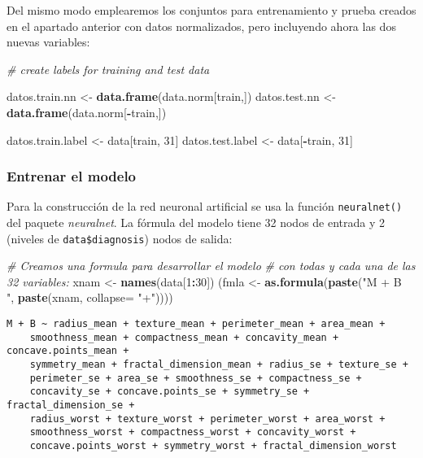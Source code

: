\documentclass[
]{article}
\newenvironment{Shaded}{\begin{snugshade}}{\end{snugshade}}
\newcommand{\CommentTok}[1]{\textcolor[rgb]{0.56,0.35,0.01}{\textit{#1}}}
\newcommand{\DataTypeTok}[1]{\textcolor[rgb]{0.13,0.29,0.53}{#1}}
\newcommand{\DecValTok}[1]{\textcolor[rgb]{0.00,0.00,0.81}{#1}}
\newcommand{\KeywordTok}[1]{\textcolor[rgb]{0.13,0.29,0.53}{\textbf{#1}}}
\newcommand{\NormalTok}[1]{#1}
\newcommand{\OperatorTok}[1]{\textcolor[rgb]{0.81,0.36,0.00}{\textbf{#1}}}
\newcommand{\StringTok}[1]{\textcolor[rgb]{0.31,0.60,0.02}{#1}}
\begin{document}
Del mismo modo emplearemos los conjuntos para entrenamiento y prueba
creados en el apartado anterior con datos normalizados, pero incluyendo
ahora las dos nuevas variables:

\begin{Shaded}
\begin{Highlighting}[]
\CommentTok{# create labels for training and test data}

\NormalTok{datos.train.nn <-}\StringTok{ }\KeywordTok{data.frame}\NormalTok{(data.norm[train,])}
\NormalTok{datos.test.nn  <-}\StringTok{ }\KeywordTok{data.frame}\NormalTok{(data.norm[}\OperatorTok{-}\NormalTok{train,])}

\NormalTok{datos.train.label <-}\StringTok{ }\NormalTok{data[train, }\DecValTok{31}\NormalTok{]}
\NormalTok{datos.test.label <-}\StringTok{ }\NormalTok{data[}\OperatorTok{-}\NormalTok{train, }\DecValTok{31}\NormalTok{]}
\end{Highlighting}
\end{Shaded}

\hypertarget{entrenar-el-modelo-2}{%
\subsubsection{Entrenar el modelo}\label{entrenar-el-modelo-2}}

Para la construcción de la red neuronal artificial se usa la función
\texttt{neuralnet()} del paquete \emph{neuralnet}. La fórmula del modelo
tiene 32 nodos de entrada y 2 (niveles de \texttt{data\$diagnosis})
nodos de salida:

\begin{Shaded}
\begin{Highlighting}[]
\CommentTok{# Creamos una formula para desarrollar el modelo }
\CommentTok{# con todas y cada una de las 32 variables:}
\NormalTok{xnam <-}\StringTok{ }\KeywordTok{names}\NormalTok{(data[}\DecValTok{1}\OperatorTok{:}\DecValTok{30}\NormalTok{])}
\NormalTok{(fmla <-}\StringTok{ }\KeywordTok{as.formula}\NormalTok{(}\KeywordTok{paste}\NormalTok{(}\StringTok{"M + B ~ "}\NormalTok{, }\KeywordTok{paste}\NormalTok{(xnam, }\DataTypeTok{collapse=} \StringTok{"+"}\NormalTok{))))}
\end{Highlighting}
\end{Shaded}

\begin{verbatim}
M + B ~ radius_mean + texture_mean + perimeter_mean + area_mean + 
    smoothness_mean + compactness_mean + concavity_mean + concave.points_mean + 
    symmetry_mean + fractal_dimension_mean + radius_se + texture_se + 
    perimeter_se + area_se + smoothness_se + compactness_se + 
    concavity_se + concave.points_se + symmetry_se + fractal_dimension_se + 
    radius_worst + texture_worst + perimeter_worst + area_worst + 
    smoothness_worst + compactness_worst + concavity_worst + 
    concave.points_worst + symmetry_worst + fractal_dimension_worst
\end{verbatim}
\end{document}
